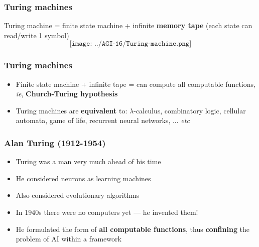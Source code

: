 \documentclass[17pt]{beamer}
\begin{document}
\begin{frame}
\frametitle{Turing machines}
	Turing machine = finite state machine + infinite {\color{red}\textbf{memory tape}} (each state can read/write 1 symbol)\\
	\begin{equation}
	\label{fig:Turing-machine}
	\texttt{[image: ../AGI-16/Turing-machine.png]}
	\end{equation}
\end{frame}

\begin{frame}
\frametitle{Turing machines}
\begin{itemize}
	\item Finite state machine + infinite tape = can compute all computable functions, \textit{ie}, \textbf{Church-Turing hypothesis}
	\item Turing machines are \textbf{equivalent} to: $\lambda$-calculus, combinatory logic, cellular automata, game of life, recurrent neural networks, ... \textit{etc}
\end{itemize}
\end{frame}

\begin{frame}
\frametitle{Alan Turing (1912-1954)}
\begin{itemize}
	\item Turing was a man very much ahead of his time
	\item He considered neurons as learning machines
	\item Also considered evolutionary algorithms
	\item In 1940s there were no computers yet --- he invented them!
	\item {\color{red}He formulated the form of \textbf{all computable functions}, thus \textbf{confining} the problem of AI within a framework}
\end{itemize}
\end{frame}
\end{document}
